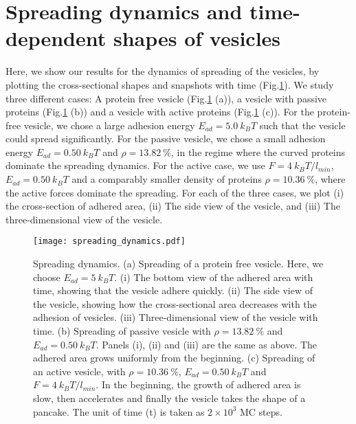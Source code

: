 \documentclass[pre,amsmath]{revtex4}
\begin{document}
\section{Spreading dynamics and time-dependent shapes of vesicles}
\label{sec:spreading_dynamics}
Here, we show our results for the dynamics of spreading of the vesicles, by plotting the cross-sectional shapes and snapshots with time (Fig.\ref{spreading_dynamics}). We study three different cases: A protein free vesicle (Fig.\ref{spreading_dynamics} (a)), a vesicle with passive proteins  (Fig.\ref{spreading_dynamics} (b)) and a vesicle with active proteins  (Fig.\ref{spreading_dynamics} (c)). For the protein-free vesicle, we chose a large adhesion energy $E_{ad}=5.0 ~k_B T$ such that the vesicle could spread significantly. For the passive vesicle, we chose a small adhesion energy $E_{ad}=0.50 ~k_B T$ and $\rho=13.82~ \%$, in the regime where the curved proteins dominate the spreading dynamics. For the active case, we use $F=4 ~k_B T /l_{min}$, $E_{ad}=0.50 ~k_B T$ and a comparably smaller density of proteins $\rho=10.36 ~\%$, where the active forces dominate the spreading. For each of the three cases, we plot (i) the cross-section of adhered area, (ii) The side view of the vesicle, and (iii) The three-dimensional view of the vesicle. 
\begin{figure}[ht]
\centering
\texttt{[image: spreading\_dynamics.pdf]}
\caption{Spreading dynamics. (a) Spreading of a protein free vesicle. Here, we choose $E_{ad}=5 ~k_B T$. (i) The bottom view of the adhered area with time, showing that the vesicle adhere quickly. (ii) The side view of the vesicle, showing how the cross-sectional area decreases with the adhesion of vesicles. (iii) Three-dimensional view of the vesicle with time. (b) Spreading of passive vesicle with $\rho=13.82 ~\%$ and $E_{ad}=0.50 ~k_B T$. Panels (i), (ii) and (iii) are the same as above. The adhered area grows uniformly from the beginning. (c) Spreading of an active vesicle, with $\rho=10.36 ~\%$, $E_{ad}=0.50 ~k_B T$ and $F=4 ~k_B T /l_{min}$. In the beginning, the growth of adhered area is slow, then accelerates and finally the vesicle takes the shape of a pancake. The unit of time (t) is taken as $2 \times 10^3$ MC steps.}
\label{spreading_dynamics} 
\end{figure}

\end{document}
